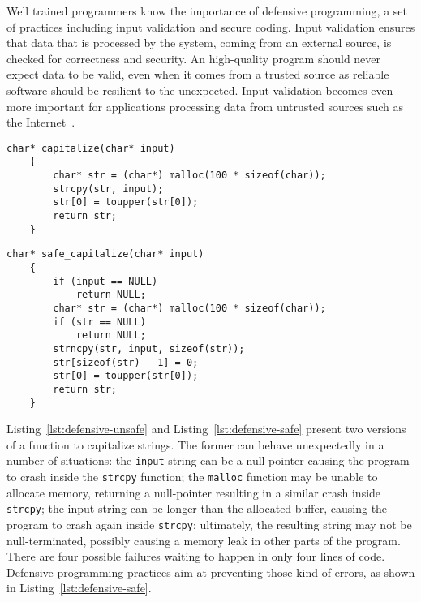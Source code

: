 Well trained programmers know the importance of defensive programming, a set of
practices including input validation and secure coding. Input validation ensures
that data that is processed by the system, coming from an external source, is
checked for correctness and security. An high-quality program should never
expect data to be valid, even when it comes from a trusted source as reliable
software should be resilient to the unexpected. Input validation becomes even
more important for applications processing data from untrusted sources such as
the Internet~\cite{scholte2012have}.

\begin{lstlisting}[caption={Defensive programming: unsafe example},
                   label=lst:defensive-unsafe]
    char* capitalize(char* input)
    {
        char* str = (char*) malloc(100 * sizeof(char));
        strcpy(str, input);
        str[0] = toupper(str[0]);
        return str;
    }
\end{lstlisting}
\begin{lstlisting}[caption={Defensive programming: safe example},
                   label=lst:defensive-safe]
    char* safe_capitalize(char* input)
    {
        if (input == NULL)
            return NULL;
        char* str = (char*) malloc(100 * sizeof(char));
        if (str == NULL)
            return NULL;
        strncpy(str, input, sizeof(str));
        str[sizeof(str) - 1] = 0;
        str[0] = toupper(str[0]);
        return str;
    }
\end{lstlisting}

Listing~\ref{lst:defensive-unsafe} and Listing~\ref{lst:defensive-safe} present
two versions of a function to capitalize strings. The former can behave
unexpectedly in a number of situations: the \texttt{input} string can be a
null-pointer causing the program to crash inside the \texttt{strcpy} function;
the \texttt{malloc} function may be unable to allocate memory, returning a
null-pointer resulting in a similar crash inside \texttt{strcpy}; the input
string can be longer than the allocated buffer, causing the program to crash
again inside \texttt{strcpy}; ultimately, the resulting string may not be
null-terminated, possibly causing a memory leak in other parts of the program.
There are four possible failures waiting to happen in only four lines of code.
Defensive programming practices aim at preventing those kind of errors, as shown
in Listing~\ref{lst:defensive-safe}.

